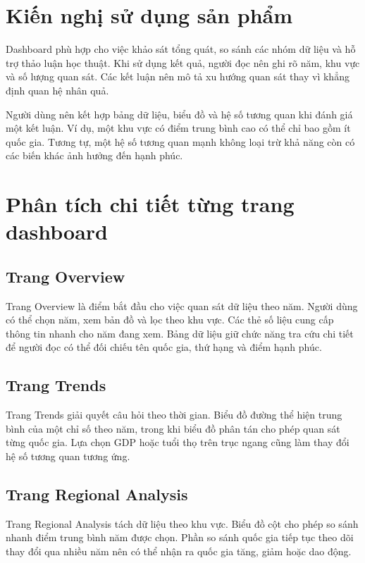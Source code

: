 \section{Kiến nghị sử dụng sản phẩm}

Dashboard phù hợp cho việc khảo sát tổng quát, so sánh các nhóm dữ liệu và hỗ trợ thảo luận học thuật. Khi sử dụng kết quả, người đọc nên ghi rõ năm, khu vực và số lượng quan sát. Các kết luận nên mô tả xu hướng quan sát thay vì khẳng định quan hệ nhân quả.

Người dùng nên kết hợp bảng dữ liệu, biểu đồ và hệ số tương quan khi đánh giá một kết luận. Ví dụ, một khu vực có điểm trung bình cao có thể chỉ bao gồm ít quốc gia. Tương tự, một hệ số tương quan mạnh không loại trừ khả năng còn có các biến khác ảnh hưởng đến hạnh phúc.

\section{Phân tích chi tiết từng trang dashboard}

\subsection{Trang Overview}

Trang Overview là điểm bắt đầu cho việc quan sát dữ liệu theo năm. Người dùng có thể chọn năm, xem bản đồ và lọc theo khu vực. Các thẻ số liệu cung cấp thông tin nhanh cho năm đang xem. Bảng dữ liệu giữ chức năng tra cứu chi tiết để người đọc có thể đối chiếu tên quốc gia, thứ hạng và điểm hạnh phúc.

\subsection{Trang Trends}

Trang Trends giải quyết câu hỏi theo thời gian. Biểu đồ đường thể hiện trung bình của một chỉ số theo năm, trong khi biểu đồ phân tán cho phép quan sát từng quốc gia. Lựa chọn GDP hoặc tuổi thọ trên trục ngang cũng làm thay đổi hệ số tương quan tương ứng.

\subsection{Trang Regional Analysis}

Trang Regional Analysis tách dữ liệu theo khu vực. Biểu đồ cột cho phép so sánh nhanh điểm trung bình năm được chọn. Phần so sánh quốc gia tiếp tục theo dõi thay đổi qua nhiều năm nên có thể nhận ra quốc gia tăng, giảm hoặc dao động.

